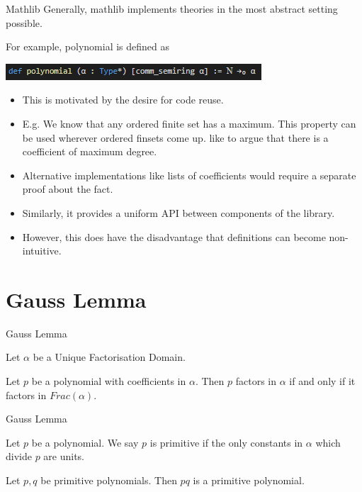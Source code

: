 \documentclass{beamer}
\begin{document}
\begin{frame}{Mathlib}
  Generally, mathlib implements theories in the most abstract setting possible. 

  For example, polynomial is defined as

  \includegraphics{polynomial.png}

  \begin{itemize}
    \item  This is motivated by the desire for code reuse. 
    \item E.g. We know that any ordered finite set has a maximum. This property can be used wherever ordered finsets come up. 
          like to argue that there is a coefficient of maximum degree. 
    \item Alternative implementations like lists of coefficients would require a separate proof about the fact. 
    \item Similarly, it provides a uniform API between components of the library. 
    \item However, this does have the disadvantage that definitions can become non-intuitive.
  \end{itemize}
\end{frame}

\section {Gauss Lemma}

\begin{frame}{Gauss Lemma}
  \begin{theorem}
    Let $\alpha$ be a Unique Factorisation Domain. 

    Let $p$ be a polynomial with coefficients in $\alpha$. Then $p$ factors in $\alpha$ if and only if it factors in $Frac(\alpha)$.
  \end{theorem}
\end{frame} 

\begin{frame}{Gauss Lemma}
  \begin{definition}
    Let $p$ be a polynomial. We say $p$ is primitive if the only constants in $ \alpha $ which divide $p$ are units. 
  \end{definition}

  \begin{lemma}
    Let $p,q$ be primitive polynomials. Then $pq$ is a primitive polynomial.
  \end{lemma}

\end{frame}
\end{document}
